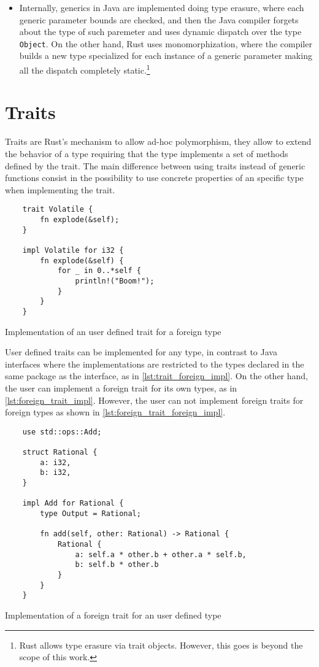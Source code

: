 \begin{itemize}
    \item Internally, generics in Java are implemented doing type erasure, where
        each generic parameter bounds are checked, and then the Java compiler
        forgets about the type of such paremeter and uses dynamic dispatch over
        the type \texttt{Object}. On the other hand, Rust uses monomorphization,
        where the compiler builds a new type specialized for each instance of a
        generic parameter making all the dispatch completely
        static.\footnote{Rust allows type erasure via trait objects. However,
        this goes is beyond the scope of this work.}
\end{itemize}

\section{Traits}

Traits are Rust's mechanism to allow ad-hoc polymorphism, they allow to extend
the behavior of a type requiring that the type implements a set of methods
defined by the trait. The main difference between using traits instead of
generic functions consist in the possibility to use concrete properties of an
specific type when implementing the trait. \cite{traits}

\begin{listing}[ht]
	\begin{verbatim}
    trait Volatile {
        fn explode(&self);
    }

    impl Volatile for i32 {
        fn explode(&self) {
            for _ in 0..*self {
                println!("Boom!");
            }
        }
    }
    \end{verbatim}
  \caption{Implementation of an user defined trait for a foreign type}
  \label{lst:trait_foreign_impl}
\end{listing}

User defined traits can be implemented for any type, in contrast to Java
interfaces where the implementations are restricted to the types declared in the
same package as the interface, as in \ref{lst:trait_foreign_impl}. On the other
hand, the user can implement a foreign trait for its own types, as in
\ref{lst:foreign_trait_impl}. However, the user can not implement foreign traits
for foreign types as shown in \ref{lst:foreign_trait_foreign_impl}.

\begin{listing}[ht]
	\begin{verbatim}
    use std::ops::Add;

    struct Rational {
        a: i32,
        b: i32,
    }

    impl Add for Rational {
        type Output = Rational;
        
        fn add(self, other: Rational) -> Rational {
            Rational {
                a: self.a * other.b + other.a * self.b,
                b: self.b * other.b
            }
        }
    }
    \end{verbatim}
  \caption{Implementation of a foreign trait for an user defined type}
  \label{lst:foreign_trait_impl}
\end{listing}

